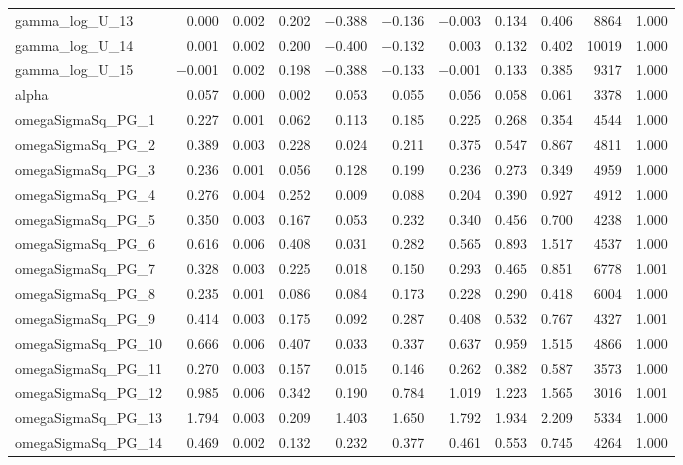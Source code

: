 \documentclass[12pt]{article}
\begin{document}
\begin{longtable}{lrrrrrrrrrr}
gamma\_log\_U\_13 &  0.000 & 0.002 & 0.202 & $-$0.388 & $-$0.136 & $-$0.003 &  0.134 &  0.406 &  8864 & 1.000 \\
gamma\_log\_U\_14 &  0.001 & 0.002 & 0.200 & $-$0.400 & $-$0.132 &  0.003 &  0.132 &  0.402 & 10019 & 1.000 \\
gamma\_log\_U\_15 & $-$0.001 & 0.002 & 0.198 & $-$0.388 & $-$0.133 & $-$0.001 &  0.133 &  0.385 &  9317 & 1.000 \\
\addlinespace
alpha & 0.057 & 0.000 & 0.002 & 0.053 & 0.055 & 0.056 & 0.058 & 0.061 & 3378 & 1.000 \\
\addlinespace
omegaSigmaSq\_PG\_1   & 0.227 & 0.001 & 0.062 & 0.113 & 0.185 & 0.225 & 0.268 & 0.354 &  4544 & 1.000 \\
omegaSigmaSq\_PG\_2   & 0.389 & 0.003 & 0.228 & 0.024 & 0.211 & 0.375 & 0.547 & 0.867 &  4811 & 1.000 \\
omegaSigmaSq\_PG\_3   & 0.236 & 0.001 & 0.056 & 0.128 & 0.199 & 0.236 & 0.273 & 0.349 &  4959 & 1.000 \\
omegaSigmaSq\_PG\_4   & 0.276 & 0.004 & 0.252 & 0.009 & 0.088 & 0.204 & 0.390 & 0.927 &  4912 & 1.000 \\
omegaSigmaSq\_PG\_5   & 0.350 & 0.003 & 0.167 & 0.053 & 0.232 & 0.340 & 0.456 & 0.700 &  4238 & 1.000 \\
omegaSigmaSq\_PG\_6   & 0.616 & 0.006 & 0.408 & 0.031 & 0.282 & 0.565 & 0.893 & 1.517 &  4537 & 1.000 \\
omegaSigmaSq\_PG\_7   & 0.328 & 0.003 & 0.225 & 0.018 & 0.150 & 0.293 & 0.465 & 0.851 &  6778 & 1.001 \\
omegaSigmaSq\_PG\_8   & 0.235 & 0.001 & 0.086 & 0.084 & 0.173 & 0.228 & 0.290 & 0.418 &  6004 & 1.000 \\
omegaSigmaSq\_PG\_9   & 0.414 & 0.003 & 0.175 & 0.092 & 0.287 & 0.408 & 0.532 & 0.767 &  4327 & 1.001 \\
omegaSigmaSq\_PG\_10  & 0.666 & 0.006 & 0.407 & 0.033 & 0.337 & 0.637 & 0.959 & 1.515 &  4866 & 1.000 \\
omegaSigmaSq\_PG\_11  & 0.270 & 0.003 & 0.157 & 0.015 & 0.146 & 0.262 & 0.382 & 0.587 &  3573 & 1.000 \\
omegaSigmaSq\_PG\_12  & 0.985 & 0.006 & 0.342 & 0.190 & 0.784 & 1.019 & 1.223 & 1.565 &  3016 & 1.001 \\
omegaSigmaSq\_PG\_13  & 1.794 & 0.003 & 0.209 & 1.403 & 1.650 & 1.792 & 1.934 & 2.209 &  5334 & 1.000 \\
omegaSigmaSq\_PG\_14  & 0.469 & 0.002 & 0.132 & 0.232 & 0.377 & 0.461 & 0.553 & 0.745 &  4264 & 1.000 \\

\end{longtable}
\end{document}
